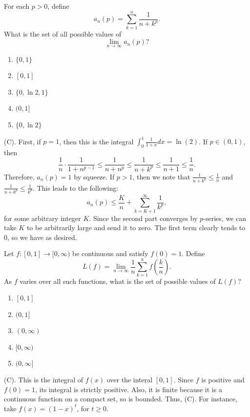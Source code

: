 \begin{exercise}
For each $p>0$, define
\[
a_n(p)=\sum_{k=1}^n\frac{1}{n+k^p}.
\]
What is the set of all possible values of
\[
\lim_{n\to\infty}a_n(p)?
\]

\begin{enumerate}[label=(\Alph*)]
    \item $\{0,1\}$
    \item $[0,1]$
    \item $\{0,\ln 2,1\}$
    \item $(0,1]$
    \item $\{0,\ln 2\}$
\end{enumerate}
\end{exercise}
\begin{solution}
(C). First, if $p = 1$, then this is the integral $\int_0^1 \frac{1}{1 + x}dx = \ln(2)$. 
If $p \in (0,1)$, then
\[
\frac{1}{n} \cdot \frac{1}{1 + n^{p - 1}} \leq \frac{1}{n + n^p} 
\leq \frac{1}{n + k^p} \leq \frac{1}{n + 1} \leq \frac{1}{n}.
\]
Therefore, $a_n(p) = 1$ by squeeze. If $p > 1$, then we note that $\frac{1}{n + k^p} \leq \frac{1}{n}$ and 
$\frac{1}{n + k^p} \leq \frac{1}{k^p}$. This leads to the following:
\[
a_n(p) \leq \frac{K}{n} + \sum_{k = K + 1}^{\infty} \frac{1}{k^p},
\]
for some arbitrary integer $K$. Since the second part converges by $p$-series, we can take $K$ to be arbitrarily 
large and send it to zero. The first term clearly tends to $0$, so we have as desired.
\end{solution}

\begin{exercise}
Let $f:[0,1]\to[0,\infty)$ be continuous and satisfy $f(0)=1$. Define
\[
L(f)=\lim_{n\to\infty}
\frac{1}{n}\sum_{k=1}^n f\left(\frac{k}{n}\right).
\]
As $f$ varies over all such functions,
what is the set of possible values of $L(f)$?
\begin{enumerate}[label=(\Alph*)]
    \item $[0,1]$
    \item $(0,1]$
    \item $(0,\infty)$
    \item $[0,\infty)$
    \item $(0,\infty]$
\end{enumerate}
\end{exercise}
\begin{solution}
(C). This is the integral of $f(x)$ over the interal $[0,1]$.
Since $f$ is positive and $f(0) = 1$, its integral is strictly positive. Also, 
it is finite because it is a continuous function on a compact set, so is bounded. Thus, (C).
For instance, take $f(x) = (1-x)^t$, for $t \geq 0$.
\end{solution}



